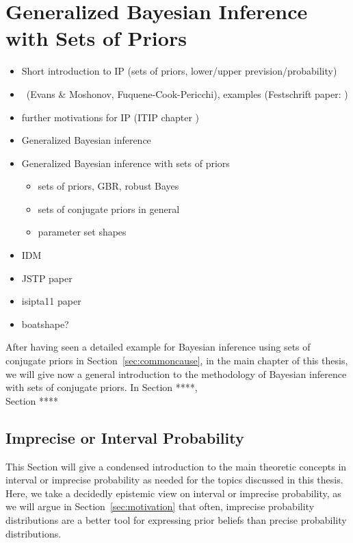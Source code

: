 \chapter{Generalized Bayesian Inference with Sets of Priors}
\label{cha:gbi}

\begin{itemize}
\item Short introduction to IP (sets of priors, lower/upper prevision/probability)
\item \pdc\ (Evans \& Moshonov, Fuquene-Cook-Pericchi), examples (Festschrift paper: \cite{Walter2010a})
\item further motivations for IP (ITIP chapter \cite{itip-statinf}) 
\item Generalized Bayesian inference
\item Generalized Bayesian inference with sets of priors
 \begin{itemize}
 \item sets of priors, GBR, robust Bayes
 \item sets of conjugate priors in general
 \item parameter set shapes
 \end{itemize}
\item IDM
\item JSTP paper \cite{Walter2009a}
\item isipta11 paper \cite{Walter2011a}
\item boatshape?
\end{itemize}



After having seen a detailed example for Bayesian inference using sets of conjugate priors in Section~\ref{sec:commoncause},
in the main chapter of this thesis,
we will give now a general introduction to the methodology of Bayesian inference with sets of conjugate priors.
In Section ****, \\
Section **** 


\section{Imprecise or Interval Probability}
\label{sec:ip-intro}

This Section will give a condensed introduction to the main theoretic concepts
in interval or imprecise probability as needed for the topics discussed in this thesis.
Here, we take a decidedly epistemic view on interval or imprecise probability,
as we will argue in Section~\ref{sec:motivation} that often,
imprecise probability distributions are a better tool for expressing prior beliefs
than precise probability distributions.

